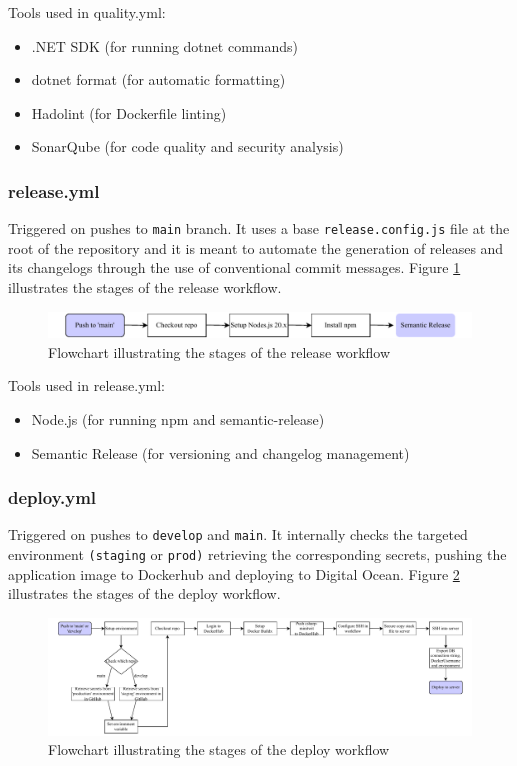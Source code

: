 \noindent  Tools used in quality.yml:

\begin{itemize}
    \item .NET SDK (for running dotnet commands)
    \item dotnet format (for automatic formatting)
    \item Hadolint (for Dockerfile linting)
    \item SonarQube (for code quality and security analysis)
\end{itemize}

\subsubsection{release.yml}
Triggered on pushes to \texttt{main} branch. It uses a base \texttt{release.config.js} file at the root of the repository and it is meant to automate the generation of releases and its changelogs through the use of conventional commit messages. Figure \ref{fig:release.yml} illustrates the stages of the release workflow.

\begin{figure}[H]
    \centering
    \includegraphics[width=\textwidth]{images/figures/Release.pdf}
    \caption{Flowchart illustrating the stages of the release workflow}
    \label{fig:release.yml}
\end{figure}

\noindent  Tools used in release.yml:
\begin{itemize}
    \item Node.js (for running npm and semantic-release)
    \item Semantic Release (for versioning and changelog management)
\end{itemize}

\subsubsection{deploy.yml}
Triggered on pushes to \texttt{develop} and \texttt{main}. It internally checks the targeted environment \texttt{(staging} or \texttt{prod)} retrieving the corresponding secrets, pushing the application image to Dockerhub and deploying to Digital Ocean. Figure \ref{fig:deploy.yml} illustrates the stages of the deploy workflow.

\begin{figure}[H]
    \centering
    \includegraphics[width=\textwidth]{images/figures/Deploy.pdf}
    \caption{Flowchart illustrating the stages of the deploy workflow}
    \label{fig:deploy.yml}
\end{figure}

